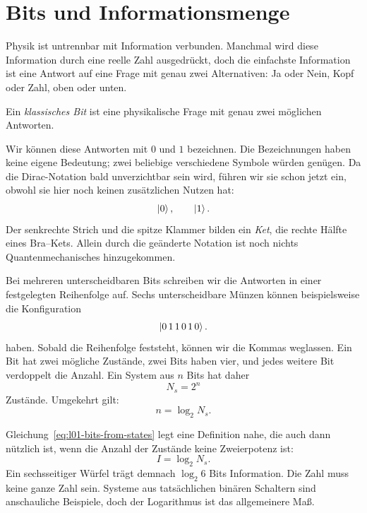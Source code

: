 \section{Bits und Informationsmenge}

Physik ist untrennbar mit Information verbunden. Manchmal wird diese Information durch eine reelle Zahl ausgedrückt, doch die einfachste Information ist eine Antwort auf eine Frage mit genau zwei Alternativen: Ja oder Nein, Kopf oder Zahl, oben oder unten.

\begin{definition}Ein \emph{klassisches Bit} ist eine physikalische Frage mit genau zwei möglichen Antworten.\end{definition}

Wir können diese Antworten mit \(0\) und \(1\) bezeichnen. Die Bezeichnungen haben keine eigene Bedeutung; zwei beliebige verschiedene Symbole würden genügen. Da die Dirac-Notation bald unverzichtbar sein wird, führen wir sie schon jetzt ein, obwohl sie hier noch keinen zusätzlichen Nutzen hat:
\begin{equation}
  \left\lvert0\right\rangle,
  \qquad
  \left\lvert1\right\rangle.
\end{equation}
Der senkrechte Strich und die spitze Klammer bilden ein \emph{Ket}, die rechte Hälfte eines Bra--Kets. Allein durch die geänderte Notation ist noch nichts Quantenmechanisches hinzugekommen.

Bei mehreren unterscheidbaren Bits schreiben wir die Antworten in einer festgelegten Reihenfolge auf. Sechs unterscheidbare Münzen können beispielsweise die Konfiguration
\begin{equation}
  \left\lvert0\,1\,1\,0\,1\,0\right\rangle.
\end{equation}
haben. Sobald die Reihenfolge feststeht, können wir die Kommas weglassen. Ein Bit hat zwei mögliche Zustände, zwei Bits haben vier, und jedes weitere Bit verdoppelt die Anzahl. Ein System aus \(n\) Bits hat daher
\begin{equation}
  N_s=2^n
  \label{eq:l01-state-count}
\end{equation}
Zustände. Umgekehrt gilt:
\begin{equation}
  n=\log_2 N_s.
  \label{eq:l01-bits-from-states}
\end{equation}

Gleichung~\eqref{eq:l01-bits-from-states} legt eine Definition nahe, die auch dann nützlich ist, wenn die Anzahl der Zustände keine Zweierpotenz ist:
\begin{equation}
  I=\log_2 N_s.
  \label{eq:l01-information}
\end{equation}
Ein sechsseitiger Würfel trägt demnach \(\log_2 6\) Bits Information. Die Zahl muss keine ganze Zahl sein. Systeme aus tatsächlichen binären Schaltern sind anschauliche Beispiele, doch der Logarithmus ist das allgemeinere Maß.

